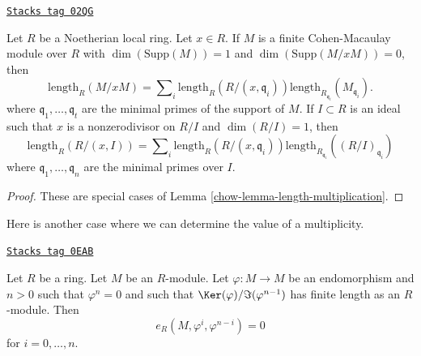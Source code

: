 \begin{lemma}
\label{chow-lemma-additivity-divisors-restricted}
\href{https://stacks.math.columbia.edu/tag/02QG}{\texttt{Stacks tag 02QG}}

Let $R$ be a Noetherian local ring.
Let $x \in R$. If $M$ is a finite Cohen-Macaulay module over $R$
with $\dim(\text{Supp}(M)) = 1$ and $\dim(\text{Supp}(M/xM)) = 0$, then
$$
\text{length}_R(M/xM)
=
\sum\nolimits_i \text{length}_R(R/(x, \mathfrak q_i))
\text{length}_{R_{\mathfrak q_i}}(M_{\mathfrak q_i}).
$$
where $\mathfrak q_1, \ldots, \mathfrak q_t$ are the
minimal primes of the support of $M$. If $I \subset R$ is an ideal
such that $x$ is a nonzerodivisor on $R/I$ and $\dim(R/I) = 1$, then
$$
\text{length}_R(R/(x, I))
=
\sum\nolimits_i \text{length}_R(R/(x, \mathfrak q_i))
\text{length}_{R_{\mathfrak q_i}}((R/I)_{\mathfrak q_i})
$$
where $\mathfrak q_1, \ldots, \mathfrak q_n$ are the minimal
primes over $I$.
\end{lemma}

\begin{proof}

These are special cases of Lemma \ref{chow-lemma-length-multiplication}.
\end{proof}

Here is another case where we can determine the value of a multiplicity.

\begin{lemma}
\label{chow-lemma-powers-period-length-zero}
\href{https://stacks.math.columbia.edu/tag/0EAB}{\texttt{Stacks tag 0EAB}}

Let $R$ be a ring. Let $M$ be an $R$-module.
Let $\varphi : M \to M$ be an endomorphism and $n > 0$
such that $\varphi^n = 0$ and such that $\Ker(\varphi)/\Im(\varphi^{n - 1})$
has finite length as an $R$-module.
Then
$$
e_R(M, \varphi^i, \varphi^{n - i}) = 0
$$
for $i = 0, \ldots, n$.
\end{lemma}

